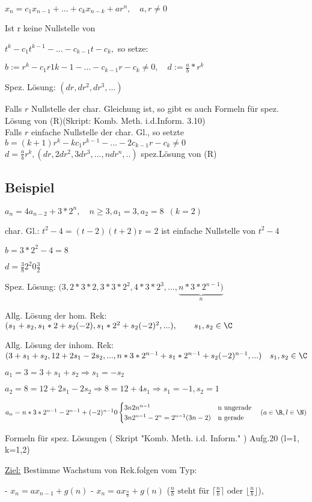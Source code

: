 $x_n = c_1x_{n-1}+...+c_kx_{n-k}+ar^n, \quad a,r\neq 0 $

Ist r keine Nullstelle von

$t^k-c_1t^{k-1}-...-c_{k-1}t-c_k,$ so setze:

$b:= r^k-c_1r1{k-1}-...-c_{k-1}r-c_k \neq 0,\quad d:=\frac{a}{b}*r^k$

Spez. Lösung: $(dr,dr^2,dr^3,...)$

Falls $r$ Nullstelle der char. Gleichung ist, so gibt es auch Formeln für spez. Lösung von (R)(Skript: Komb. Meth. i.d.Inform. 3.10)\\

Falls $r$ einfache Nullstelle der char. Gl., so setzte $b=(k+1)r^k-kc_1r^{k-1}-...-2c_{k-1}r-c_k \neq 0$
$d=\frac{a}{b} r^k, (dr,2dr^2,3dr^3,...,ndr^n,..)$ spez.Lösung von (R)

\subsection{Beispiel}
$a_n = 4a_{n-2}+3*2^n,\quad n\geq 3, a_1 =3, a_2 = 8 \enspace (k=2)$

char. Gl.: $ t^2-4=(t-2)(t+2)$\qquad r = 2 ist einfache Nullstelle von $t^2-4$ 

$b=3*2^2-4=8$

$d=\frac{3}{8}2^2 0 \frac{3}{2}$

Spez. Lösung: $(3,2*3*2,3*3*2^2,4*3*2^3,...,\underbrace{n*3*2^{n-1})}_n$

Allg. Lösung der hom. Rek: $(s_1+s_2,s_1*2+s_2(-2),s_1*2^2+s_2(-2)^2,...),\qquad s_1,s_2 \in \C$

Allg. Lösung der inhom. Rek: $(3+s_1+s_2,12+2s_1-2s_2,...,n*3*2^{n-1}+s_1*2^{n-1}+s_2(-2)^{n-1},...) \quad s_1,s_2 \in \C$

$a_1 = 3 = 3+s_1 +s_2 \Rightarrow s_1 = -s_2$

$a_2 = 8 = 12+2s_1-2s_2 \Rightarrow 8=12+4s_1 \Rightarrow s_1 = -1, s_2=1$

$a_n = n*3*2^{n-1}-2^{n-1}+(-2)^{n-1} 0 \begin{cases}
3n2n^{n-1} & \text{n ungerade}\\
3n2^{n-1}-2^n = 2^{n-1}(3n-2) & \text{n gerade}
\end{cases} \quad (a \in \R, l \in \N)$ 

Formeln für spez. Lösungen ( Skript "Komb. Meth. i.d. Inform." ) Aufg.20 (l=1, k=1,2)

\underline{Ziel:} Bestimme Wachstum von Rek.folgen vom Typ:

- $x_n = ax_{n-1}+g(n)$
- $x_n = ax_{\frac{n}{b}}+g(n)$ ($\frac{n}{b} \text{ steht für } \lceil \frac{n}{b}\rceil \text{ oder } \lfloor \frac{n}{b} \rfloor$),

